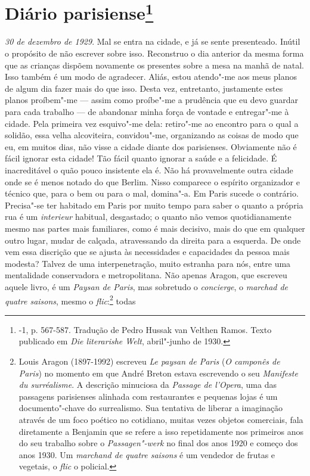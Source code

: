 \chapter{Diário parisiense\footnote[*]{-1, p.
  567-587. Tradução de Pedro Hussak van Velthen Ramos. Texto publicado em \emph{Die literarishe Welt}, abril"-junho de 1930.}}

\emph{30 de dezembro de 1929}. Mal se entra na cidade, e já se sente
presenteado. Inútil o propósito de não escrever sobre isso.
Reconstruo o dia anterior da mesma forma que as crianças dispõem
novamente os presentes sobre a mesa na manhã de natal. Isso também é um
modo de agradecer. Aliás, estou atendo"-me aos meus planos de algum dia
fazer mais do que isso. Desta vez, entretanto, justamente estes planos
proíbem"-me --- assim como proíbe"-me a prudência que eu devo guardar para
cada trabalho --- de abandonar minha força de vontade e entregar"-me à
cidade. Pela primeira vez esquivo"-me dela: retiro"-me ao encontro para o
qual a solidão, essa velha alcoviteira, convidou"-me, organizando as
coisas de modo que eu, em muitos dias, não visse a cidade diante dos
parisienses. Obviamente não é fácil ignorar esta cidade! Tão fácil quanto
ignorar a saúde e a felicidade. É inacreditável o quão pouco insistente
ela é. Não há provavelmente outra cidade onde se é menos notado
do que Berlim. Nisso comparece o espírito organizador e
técnico que, para o bem ou para o mal, domina"-a. Em Paris sucede o
contrário. Precisa"-se ter habitado em Paris por muito tempo para saber o
quanto a própria rua é um \emph{interieur} habitual, desgastado;
o quanto não vemos quotidianamente mesmo nas partes mais
familiares, como é mais decisivo, mais do que em qualquer outro lugar, mudar de
calçada, atravessando da direita para a esquerda. De onde vem essa discrição
que se ajusta às necessidades e capacidades da pessoa mais modesta?
Talvez de uma interpenetração, muito estranha para nós, entre uma
mentalidade conservadora e metropolitana. Não apenas Aragon, que
escreveu aquele livro, é um \emph{Paysan de Paris}, mas sobretudo o
\emph{concierge}, o \emph{marchad de quatre saisons}, mesmo o
\emph{flic}:\footnote{Louis Aragon (1897-1992) escreveu
  \emph{Le paysan de Paris} (\emph{O camponês de Paris}) no momento em que André Breton estava
  escrevendo o seu \emph{Manifeste du surréalisme}. A descrição
  minuciosa da \emph{Passage de l'Opera}, uma das passagens parisienses
  alinhada com restaurantes e pequenas lojas é um documento"-chave do
  surrealismo. Sua tentativa de liberar a imaginação através de um foco
  poético no cotidiano, muitas vezes objetos comerciais, fala diretamente
  a Benjamin que se refere a isso repetidamente nos primeiros anos do
  seu trabalho sobre o \emph{Passagen"-werk} no final dos anos 1920 e
  começo dos anos 1930. Um \emph{marchand de quatre saisons} é um
  vendedor de frutas e vegetais, o \emph{flic} o policial. \versal{[N. E.]}} todas
